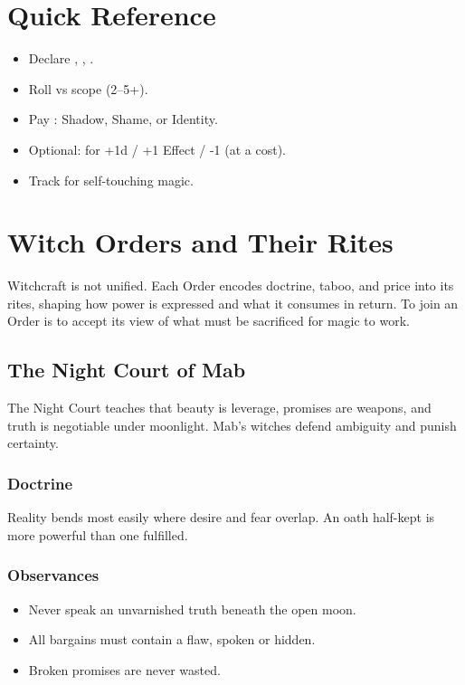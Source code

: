 \section{Quick Reference}
\begin{RuleBox}
\begin{itemize}
  \item Declare , , .
  \item Roll  vs scope \DV{} (2--5+).
  \item Pay : Shadow, Shame, or Identity.
  \item Optional:  for +1d / +1 Effect / \DV{} -1 (at a cost).
  \item Track  for self-touching magic.
\end{itemize}
\end{RuleBox}

\section{Witch Orders and Their Rites}

Witchcraft is not unified. Each Order encodes doctrine, taboo, and price into its rites, shaping how power is expressed and what it consumes in return. To join an Order is to accept its view of what must be sacrificed for magic to work.

\subsection{The Night Court of Mab}
The Night Court teaches that beauty is leverage, promises are weapons, and truth is negotiable under moonlight. Mab's witches defend ambiguity and punish certainty.

\subsubsection*{Doctrine}
Reality bends most easily where desire and fear overlap. An oath half-kept is more powerful than one fulfilled.

\subsubsection*{Observances}
\begin{itemize}
  \item Never speak an unvarnished truth beneath the open moon.
  \item All bargains must contain a flaw, spoken or hidden.
  \item Broken promises are never wasted.
\end{itemize}

